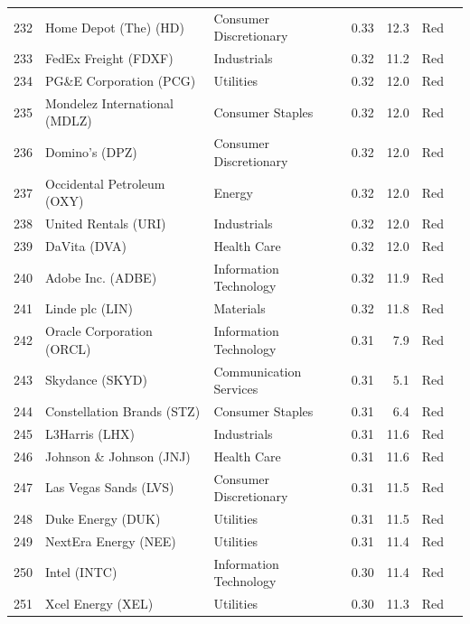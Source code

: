 \documentclass[11pt,a4paper]{article}
\begin{document}
{\begin{longtable}{r p{4.4cm} p{2.8cm} r r l l}
232 & Home Depot (The) (HD) & Consumer Discretionary & 0.33 & 12.3 & \cellcolor[HTML]{F4B6B6}Red &  \\
233 & FedEx Freight (FDXF) & Industrials & 0.32 & 11.2 & \cellcolor[HTML]{F4B6B6}Red &  \\
234 & PG\&E Corporation (PCG) & Utilities & 0.32 & 12.0 & \cellcolor[HTML]{F4B6B6}Red &  \\
235 & Mondelez International (MDLZ) & Consumer Staples & 0.32 & 12.0 & \cellcolor[HTML]{F4B6B6}Red &  \\
236 & Domino's (DPZ) & Consumer Discretionary & 0.32 & 12.0 & \cellcolor[HTML]{F4B6B6}Red &  \\
237 & Occidental Petroleum (OXY) & Energy & 0.32 & 12.0 & \cellcolor[HTML]{F4B6B6}Red &  \\
238 & United Rentals (URI) & Industrials & 0.32 & 12.0 & \cellcolor[HTML]{F4B6B6}Red &  \\
239 & DaVita (DVA) & Health Care & 0.32 & 12.0 & \cellcolor[HTML]{F4B6B6}Red &  \\
240 & Adobe Inc. (ADBE) & Information Technology & 0.32 & 11.9 & \cellcolor[HTML]{F4B6B6}Red &  \\
241 & Linde plc (LIN) & Materials & 0.32 & 11.8 & \cellcolor[HTML]{F4B6B6}Red &  \\
242 & Oracle Corporation (ORCL) & Information Technology & 0.31 & 7.9 & \cellcolor[HTML]{F4B6B6}Red &  \\
243 & Skydance (SKYD) & Communication Services & 0.31 & 5.1 & \cellcolor[HTML]{F4B6B6}Red &  \\
244 & Constellation Brands (STZ) & Consumer Staples & 0.31 & 6.4 & \cellcolor[HTML]{F4B6B6}Red &  \\
245 & L3Harris (LHX) & Industrials & 0.31 & 11.6 & \cellcolor[HTML]{F4B6B6}Red &  \\
246 & Johnson \& Johnson (JNJ) & Health Care & 0.31 & 11.6 & \cellcolor[HTML]{F4B6B6}Red &  \\
247 & Las Vegas Sands (LVS) & Consumer Discretionary & 0.31 & 11.5 & \cellcolor[HTML]{F4B6B6}Red &  \\
248 & Duke Energy (DUK) & Utilities & 0.31 & 11.5 & \cellcolor[HTML]{F4B6B6}Red &  \\
249 & NextEra Energy (NEE) & Utilities & 0.31 & 11.4 & \cellcolor[HTML]{F4B6B6}Red &  \\
250 & Intel (INTC) & Information Technology & 0.30 & 11.4 & \cellcolor[HTML]{F4B6B6}Red &  \\
251 & Xcel Energy (XEL) & Utilities & 0.30 & 11.3 & \cellcolor[HTML]{F4B6B6}Red &  \\

\end{longtable}}
\end{document}
